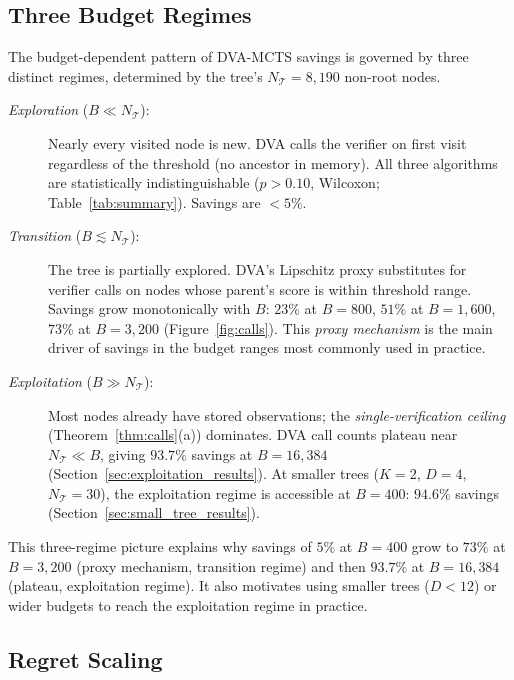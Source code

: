 \subsection{Three Budget Regimes}
\label{sec:regime}

The budget-dependent pattern of DVA-MCTS savings is governed by three distinct
regimes, determined by the tree's $N_{\mathcal{T}} = 8{,}190$ non-root nodes.

\begin{description}
  \item[\emph{Exploration} ($B \ll N_{\mathcal{T}}$):] Nearly every visited node is new.
    DVA calls the verifier on first visit regardless of the threshold (no ancestor
    in memory).  All three algorithms are statistically indistinguishable
    ($p{>}0.10$, Wilcoxon; Table~\ref{tab:summary}).  Savings are ${<}5\%$.

  \item[\emph{Transition} ($B \lesssim N_{\mathcal{T}}$):] The tree is partially explored.
    DVA's Lipschitz proxy substitutes for verifier calls on nodes whose parent's
    score is within threshold range.  Savings grow monotonically with $B$:
    $23\%$ at $B{=}800$, $51\%$ at $B{=}1{,}600$, $73\%$ at $B{=}3{,}200$
    (Figure~\ref{fig:calls}).  This \emph{proxy mechanism} is the main driver of
    savings in the budget ranges most commonly used in practice.

  \item[\emph{Exploitation} ($B \gg N_{\mathcal{T}}$):] Most nodes already have stored
    observations; the \emph{single-verification ceiling} (Theorem~\ref{thm:calls}(a))
    dominates.  DVA call counts plateau near $N_{\mathcal{T}} \ll B$, giving
    $93.7\%$ savings at $B{=}16{,}384$ (Section~\ref{sec:exploitation_results}).
    At smaller trees ($K{=}2$, $D{=}4$, $N_{\mathcal{T}}{=}30$), the exploitation
    regime is accessible at $B{=}400$: $94.6\%$ savings
    (Section~\ref{sec:small_tree_results}).
\end{description}

This three-regime picture explains why savings of $5\%$ at $B{=}400$ grow to
$73\%$ at $B{=}3{,}200$ (proxy mechanism, transition regime) and then $93.7\%$
at $B{=}16{,}384$ (plateau, exploitation regime).  It also motivates using smaller
trees ($D{<}12$) or wider budgets to reach the exploitation regime in practice.

\subsection{Regret Scaling}
\label{sec:regret_results}

